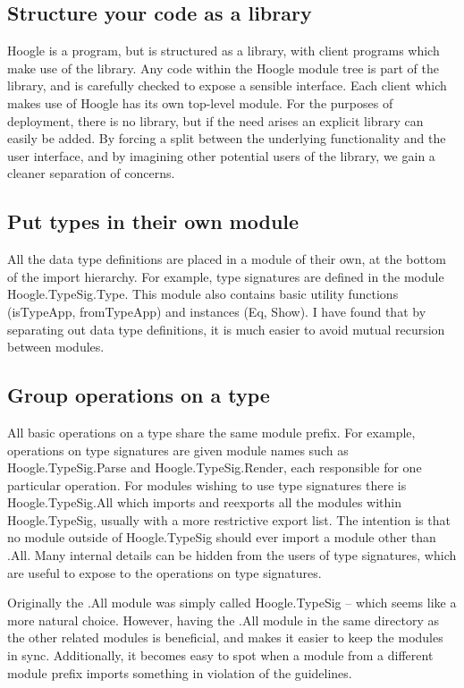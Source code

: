 \documentclass{tmr}
\newcommand{\code}[1]{\textsf{#1}}
\begin{document}
\subsection{Structure your code as a library}

Hoogle is a program, but is structured as a library, with client programs which make use of the library. Any code within the \code{Hoogle} module tree is part of the library, and is carefully checked to expose a sensible interface. Each client which makes use of Hoogle has its own top-level module. For the purposes of deployment, there is no library, but if the need arises an explicit library can easily be added. By forcing a split between the underlying functionality and the user interface, and by imagining other potential users of the library, we gain a cleaner separation of concerns.

\subsection{Put types in their own module}

All the data type definitions are placed in a module of their own, at the bottom of the import hierarchy. For example, type signatures are defined in the module \code{Hoogle.TypeSig.Type}. This module also contains basic utility functions (\code{isTypeApp}, \code{fromTypeApp}) and instances (\code{Eq}, \code{Show}). I have found that by separating out data type definitions, it is much easier to avoid mutual recursion between modules.

\subsection{Group operations on a type}

All basic operations on a type share the same module prefix. For example, operations on type signatures are given module names such as \code{Hoogle.TypeSig.Parse} and \code{Hoogle.TypeSig.Render}, each responsible for one particular operation. For modules wishing to use type signatures there is \code{Hoogle.TypeSig.All} which imports and reexports all the modules within \code{Hoogle.TypeSig}, usually with a more restrictive export list. The intention is that no module outside of \code{Hoogle.TypeSig} should ever import a module other than \code{.All}. Many internal details can be hidden from the users of type signatures, which are useful to expose to the operations on type signatures.

Originally the \code{.All} module was simply called \code{Hoogle.TypeSig} -- which seems like a more natural choice. However, having the \code{.All} module in the same directory as the other related modules is beneficial, and makes it easier to keep the modules in sync. Additionally, it becomes easy to spot when a module from a different module prefix imports something in violation of the guidelines.
\end{document}

